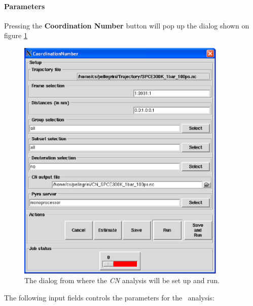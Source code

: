 \documentclass[a4paper,11pt]{report}
\begin{document}
\paragraph{Parameters\\}
\label{cn_parameters}
Pressing the \textbf{Coordination Number} button will pop up the dialog shown on figure \ref{fig:cn}
\begin{figure}[h!]
\begin{center}
\includegraphics[width=10cm]{Figures/cn.eps}
\end{center}
\caption[The \textit{CN} analysis dialog]{The dialog from where the \textit{CN} analysis will be set up and run.}
\label{fig:cn}
\end{figure}   

The following input fields controls the parameters for the \CN\ analysis:
\end{document}
